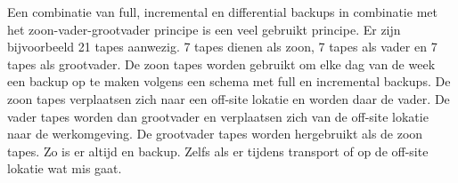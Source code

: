 Een combinatie van full, incremental en differential backups in combinatie met het zoon-vader-grootvader principe is een veel gebruikt principe. Er zijn bijvoorbeeld 21 tapes aanwezig. 7 tapes dienen als zoon, 7 tapes als vader en 7 tapes als grootvader. De zoon tapes worden gebruikt om elke dag van de week een backup op te maken volgens een schema met full en incremental backups. De zoon tapes verplaatsen zich naar een off-site lokatie en worden daar de vader. De vader tapes worden dan grootvader en verplaatsen zich van de off-site lokatie naar de werkomgeving. De grootvader tapes worden hergebruikt als de zoon tapes. Zo is er altijd en backup. Zelfs als er tijdens transport of op de off-site lokatie wat mis gaat.

